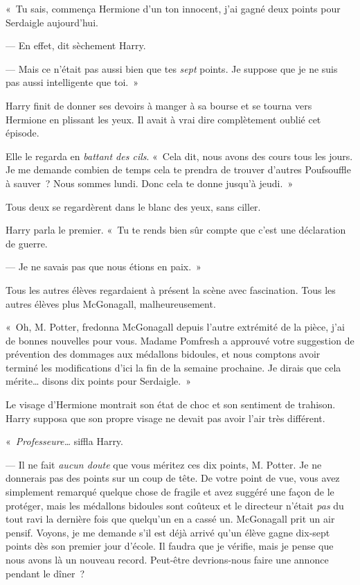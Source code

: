 «~Tu sais, commença Hermione d'un ton innocent, j'ai gagné deux points pour Serdaigle aujourd'hui.

--- En effet, dit sèchement Harry.

--- Mais ce n'était pas aussi bien que tes \emph{sept} points.
Je suppose que je ne suis pas aussi intelligente que toi.~»

Harry finit de donner ses devoirs à manger à sa bourse et se tourna vers Hermione en plissant les yeux.
Il avait à vrai dire complètement oublié cet épisode.

Elle le regarda en \emph{battant des cils}.
«~Cela dit, nous avons des cours tous les jours.
Je me demande combien de temps cela te prendra de trouver d'autres Poufsouffle à sauver~?
Nous sommes lundi.
Donc cela te donne jusqu'à jeudi.~»

Tous deux se regardèrent dans le blanc des yeux, sans ciller.

Harry parla le premier.
«~Tu te rends bien sûr compte que c'est une déclaration de guerre.

--- Je ne savais pas que nous étions en paix.~»

Tous les autres élèves regardaient à présent la scène avec fascination.
Tous les autres élèves plus McGonagall, malheureusement.

«~Oh, M. Potter, fredonna McGonagall depuis l'autre extrémité de la pièce, j'ai de bonnes nouvelles pour vous.
Madame Pomfresh a approuvé votre suggestion de prévention des dommages aux médallons bidoules, et nous comptons avoir terminé les modifications d'ici la fin de la semaine prochaine.
Je dirais que cela mérite… disons dix points pour Serdaigle.~»

Le visage d'Hermione montrait son état de choc et son sentiment de trahison.
Harry supposa que son propre visage ne devait pas avoir l'air très différent.

«~\emph{Professeure…} siffla Harry.

--- Il ne fait \emph{aucun doute} que vous méritez ces dix points, M. Potter.
Je ne donnerais pas des points sur un coup de tête.
De votre point de vue, vous avez simplement remarqué quelque chose de fragile et avez suggéré une façon de le protéger, mais les médallons bidoules sont coûteux et le directeur n'était \emph{pas} du tout ravi la dernière fois que quelqu'un en a cassé un.
McGonagall prit un air pensif.
Voyons, je me demande s'il est déjà arrivé qu'un élève gagne dix-sept points dès son premier jour d'école.
Il faudra que je vérifie, mais je pense que nous avons là un nouveau record.
Peut-être devrions-nous faire une annonce pendant le dîner~?

